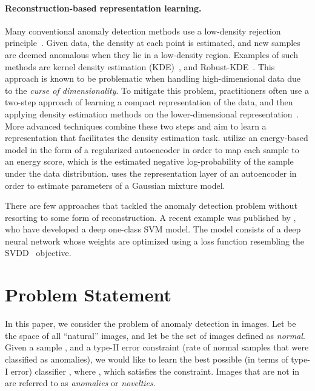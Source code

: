 \documentclass{article}
\begin{document}
	\paragraph{Reconstruction-based representation learning.}
	Many conventional anomaly detection methods use a low-density rejection principle~\cite{el2007optimal}. Given data, the density at each point is estimated, and new samples are deemed anomalous when they lie in a low-density region. Examples of such methods are kernel density estimation (KDE)~\cite{parzen1962estimation}, and Robust-KDE~\cite{kim2012robust}. This approach is known to be problematic when handling high-dimensional data due to the \textit{curse of dimensionality}. To mitigate this problem, practitioners often use a two-step approach of learning a compact representation of the data, and then applying density estimation methods on the lower-dimensional representation~\cite{candes2011robust}. More advanced techniques combine these two steps and aim to learn a representation that facilitates the density estimation task. \citet{zhai2016deep} utilize an energy-based model in the form of a regularized autoencoder in order to map each sample to an energy score, which is the estimated negative log-probability of the sample under the data distribution. \citet{zong2018deep} uses the representation layer of an autoencoder in order to estimate parameters of a Gaussian mixture model.
	
	There are few approaches that tackled the anomaly detection problem without resorting to some form of reconstruction.
	A recent example was published by \citet{ruff2018deep}, who have developed a deep one-class SVM model. The model consists of a deep neural network whose weights are optimized using a loss function resembling the SVDD~\cite{tax2004support} objective.
	


	\section{Problem Statement}
	\label{sec:problem}
	In this paper, we consider the problem of anomaly detection in images. Let  be the space of all ``natural'' images, and let  be the set of images defined as {\em normal}.
	Given a sample , and a type-II error constraint (rate of normal samples that were classified as anomalies), we would like to learn the best possible (in terms of type-I error) classifier , where , which satisfies the constraint. Images that are not in  are referred to as {\em anomalies} or {\em novelties}.
	
\end{document}
